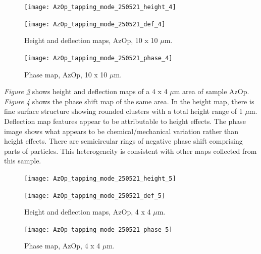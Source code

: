 \begin{figure}[H]
\centering
\begin{minipage}{.45\textwidth}
  \centering
  \texttt{[image: AzOp\_tapping\_mode\_250521\_height\_4]}
\end{minipage}
\begin{minipage}{.45\textwidth}
  \centering
  \texttt{[image: AzOp\_tapping\_mode\_250521\_def\_4]}
\end{minipage}
\caption[Height and deflection maps, AzOp]{Height and deflection maps, AzOp, 10 x 10 $\mu$m.}
\label{fig:afm_azop_height_def_3}
\end{figure}

\begin{figure}[H]
\centering
  \texttt{[image: AzOp\_tapping\_mode\_250521\_phase\_4]}
\caption[Phase map, AzOp]{Phase map, AzOp, 10 x 10 $\mu$m.}
\label{fig:afm_azop_phase_3}
\end{figure}

\textit{Figure \ref{fig:afm_azop_height_def_4}} shows height and deflection maps of a 4 x 4 $\mu$m area of sample AzOp. \textit{Figure \ref{fig:afm_azop_phase_4}} shows the phase shift map of the same area. In the height map, there is fine surface structure showing rounded clusters with a total height range of 1 $\mu$m. Deflection map features appear to be attributable to height effects. The phase image shows what appears to be chemical/mechanical variation rather than height effects. There are semicircular rings of negative phase shift comprising parts of particles. This heterogeneity is consistent with other maps collected from this sample.

\begin{figure}[H]
\centering
\begin{minipage}{.45\textwidth}
  \centering
  \texttt{[image: AzOp\_tapping\_mode\_250521\_height\_5]}
\end{minipage}
\begin{minipage}{.45\textwidth}
  \centering
  \texttt{[image: AzOp\_tapping\_mode\_250521\_def\_5]}
\end{minipage}
\caption[Height and deflection maps, AzOp]{Height and deflection maps, AzOp, 4 x 4 $\mu$m.}
\label{fig:afm_azop_height_def_4}
\end{figure}

\begin{figure}[H]
\centering
  \texttt{[image: AzOp\_tapping\_mode\_250521\_phase\_5]}
\caption[Phase map, AzOp]{Phase map, AzOp, 4 x 4 $\mu$m.}
\label{fig:afm_azop_phase_4}
\end{figure}

